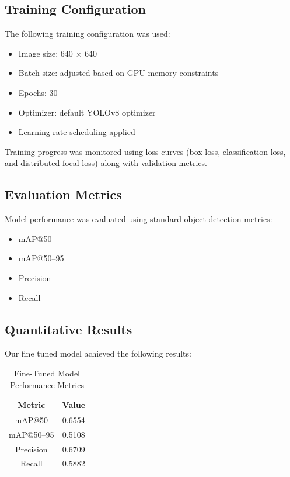 \documentclass{FastFyp}
\begin{document}
\subsection{Training Configuration}

The following training configuration was used:

\begin{itemize}
    \item Image size: 640 $\times$ 640
    \item Batch size: adjusted based on GPU memory constraints
    \item Epochs: 30
    \item Optimizer: default YOLOv8 optimizer
    \item Learning rate scheduling applied
\end{itemize}

Training progress was monitored using loss curves (box loss, classification loss, and distributed focal loss) along with validation metrics.

\subsection{Evaluation Metrics}

Model performance was evaluated using standard object detection metrics:

\begin{itemize}
    \item mAP@50
    \item mAP@50--95
    \item Precision
    \item Recall
\end{itemize}

\subsection{Quantitative Results}

Our fine tuned model achieved the following results:

\begin{table}[h]
\centering
\caption{Fine-Tuned Model Performance Metrics}
\begin{tabular}{|c|c|}
\hline
\textbf{Metric} & \textbf{Value} \\
\hline
mAP@50 & 0.6554 \\
\hline
mAP@50--95 & 0.5108 \\
\hline
Precision & 0.6709 \\
\hline
Recall & 0.5882 \\
\hline
\end{tabular}
\end{table}
\end{document}
